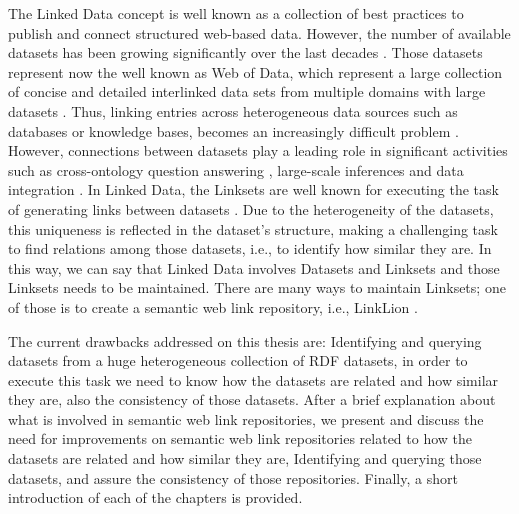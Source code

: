 

The Linked Data concept is well known as a collection of best practices to publish and connect structured web-based data. However, the number of available datasets has been growing significantly over the last decades \cite{bizer2011linked}. Those datasets represent now the well known as Web of Data, which represent a large collection of concise and detailed interlinked data sets from multiple domains with large datasets \cite{saleem2013linked}. Thus, linking entries across heterogeneous data sources such as databases or knowledge bases, becomes an increasingly difficult problem \cite{valdestilhas2017high, NGAU11, saeedi2018scalable}. However, connections between datasets play a leading role in significant activities such as cross-ontology question answering \cite{lopez2009cross}, large-scale inferences \cite{urbani2010owl} and data integration \cite{rahm2016case}. In Linked Data, the Linksets are well known for executing the task of generating links between datasets \cite{NGAU11}. Due to the heterogeneity of the datasets, this uniqueness is reflected in the dataset's structure, making a challenging task to find relations among those datasets, i.e., to identify how similar they are. In this way, we can say that Linked Data involves Datasets and Linksets and those Linksets needs to be maintained. There are many ways to maintain Linksets; one of those is to create a semantic web link repository, i.e., LinkLion \cite{linklion2014}.

The current drawbacks addressed on this thesis are: Identifying and querying datasets from a huge heterogeneous collection of RDF datasets, in order to execute this task we need to know how the datasets are related and how similar they are, also the consistency of those datasets. After a brief explanation about what is involved in semantic web link repositories, we present and discuss the need for improvements on semantic web link repositories related to how the datasets are related and how similar they are, Identifying and querying those datasets, and assure the consistency of those repositories. Finally, a short introduction of each of the chapters is provided.

